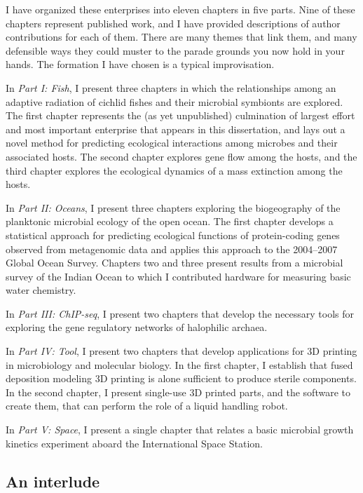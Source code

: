 I have organized these enterprises into eleven chapters in five parts. Nine of these chapters represent published work, and I have provided descriptions of author contributions for each of them. There are many themes that link them, and many defensible ways they could muster to the parade grounds you now hold in your hands. The formation I have chosen is a typical improvisation.

In {\em Part I: Fish}, I present three chapters in which the relationships among an adaptive radiation of cichlid fishes and their microbial symbionts are explored. The first chapter represents the (as yet unpublished) culmination of largest effort and most important enterprise that appears in this dissertation, and lays out a novel method for predicting ecological interactions among microbes and their associated hosts. The second chapter explores gene flow among the hosts, and the third chapter explores the ecological dynamics of a mass extinction among the hosts.

In {\em Part II: Oceans}, I present three chapters exploring the biogeography of the planktonic microbial ecology of the open ocean. The first chapter develops a statistical approach for predicting ecological functions of protein-coding genes observed from metagenomic data and applies this approach to the 2004--2007 Global Ocean Survey. Chapters two and three present results from a microbial survey of the Indian Ocean to which I contributed hardware for measuring basic water chemistry.

In {\em Part III: ChIP-seq}, I present two chapters that develop the necessary tools for exploring the gene regulatory networks of halophilic archaea.

In {\em Part IV: Tool}, I present two chapters that develop applications for 3D printing in microbiology and molecular biology. In the first chapter, I establish that fused deposition modeling 3D printing is alone sufficient to produce sterile components. In the second chapter, I present single-use 3D printed parts, and the software to create them, that can perform the role of a liquid handling robot. 

In {\em Part V: Space}, I present a single chapter that relates a basic microbial growth kinetics experiment aboard the International Space Station.

\subsection*{An interlude}

